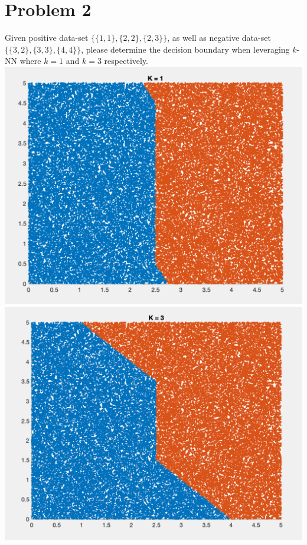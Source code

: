 \documentclass[11pt]{article}
\newcommand{\minimize}{\operatorname*{minimize\ }}
\newcommand{\mtx}[1]{\mathbf{#1}}
\def \mA {\mtx{A}}
\def \mG {\mtx{G}}
\def \mX {\mtx{X}}
\begin{document}
\section*{Problem 2}
Given positive data-set $\{\{1,1\},\{2,2\},\{2,3\}\}$, as well as negative data-set $\{\{3,2\},\{3,3\},\{4,4\}\}$, please determine the decision boundary when leveraging $k$-NN where $k=1$ and $k=3$ respectively.\\
\includegraphics[scale=.6]{k=1}\\
\includegraphics[scale=.6]{k=3}
\end{document}
